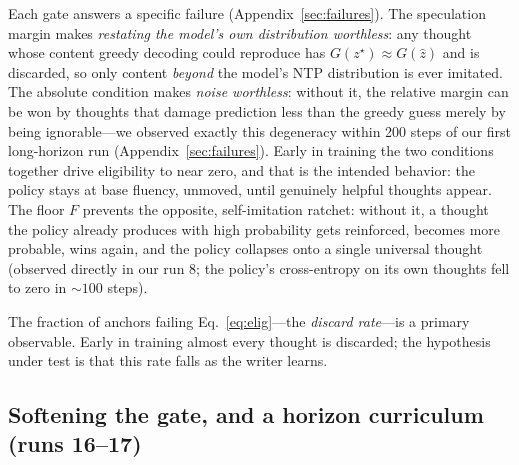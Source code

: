 \documentclass{article} %
\newcommand{\thought}{z}
\newcommand{\spec}{\hat{\thought}}
\newcommand{\best}{\thought^{\star}}
\newcommand{\gain}{G}
\begin{document}
Each gate answers a specific failure (Appendix~\ref{sec:failures}). The speculation margin makes \emph{restating the model's own distribution worthless}: any thought whose content greedy decoding could reproduce has $\gain(\best) \approx \gain(\spec)$ and is discarded, so only content \emph{beyond} the model's NTP distribution is ever imitated. The absolute condition makes \emph{noise worthless}: without it, the relative margin can be won by thoughts that damage prediction less than the greedy guess merely by being ignorable---we observed exactly this degeneracy within 200 steps of our first long-horizon run (Appendix~\ref{sec:failures}). Early in training the two conditions together drive eligibility to near zero, and that is the intended behavior: the policy stays at base fluency, unmoved, until genuinely helpful thoughts appear. The floor $F$ prevents the opposite, self-imitation ratchet: without it, a thought the policy already produces with high probability gets reinforced, becomes more probable, wins again, and the policy collapses onto a single universal thought (observed directly in our run 8; the policy's cross-entropy on its own thoughts fell to zero in ${\sim}100$ steps).

The fraction of anchors failing Eq.~\eqref{eq:elig}---the \emph{discard rate}---is a primary observable. Early in training almost every thought is discarded; the hypothesis under test is that this rate falls as the writer learns.

\subsection{Softening the gate, and a horizon curriculum (runs 16--17)}
\label{sec:soft-old}
\label{sec:softgate}
\end{document}
